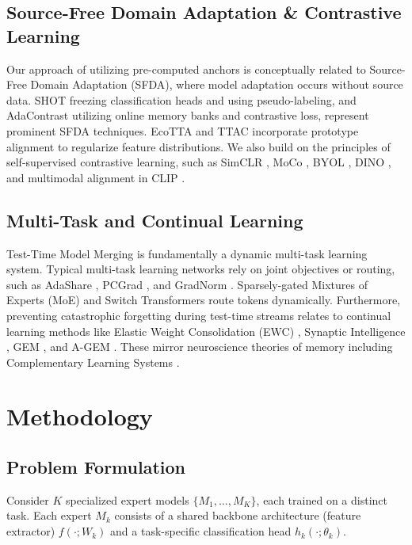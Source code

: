 \documentclass{article}
\theoremstyle{plain}
\theoremstyle{definition}
\theoremstyle{remark}
\begin{document}
\subsection{Source-Free Domain Adaptation \& Contrastive Learning}
Our approach of utilizing pre-computed anchors is conceptually related to Source-Free Domain Adaptation (SFDA), where model adaptation occurs without source data. SHOT \cite{liang2020shot} freezing classification heads and using pseudo-labeling, and AdaContrast \cite{chen2022adacontrast} utilizing online memory banks and contrastive loss, represent prominent SFDA techniques. EcoTTA \cite{yuan2023ecotta} and TTAC \cite{su2023ttac} incorporate prototype alignment to regularize feature distributions. We also build on the principles of self-supervised contrastive learning, such as SimCLR \cite{chen2020simple}, MoCo \cite{he2020momentum}, BYOL \cite{grill2020bootstrap}, DINO \cite{caron2021emerging}, and multimodal alignment in CLIP \cite{radford2021learning}.

\subsection{Multi-Task and Continual Learning}
Test-Time Model Merging is fundamentally a dynamic multi-task learning system. Typical multi-task learning networks rely on joint objectives or routing, such as AdaShare \cite{sun2020adashare}, PCGrad \cite{yu2020gradient}, and GradNorm \cite{chen2018gradnorm}. Sparsely-gated Mixtures of Experts (MoE) \cite{shazeer2017outrageously} and Switch Transformers \cite{fedus2022switch} route tokens dynamically. Furthermore, preventing catastrophic forgetting during test-time streams relates to continual learning methods like Elastic Weight Consolidation (EWC) \cite{kirkpatrick2017overcoming}, Synaptic Intelligence \cite{zenke2017continual}, GEM \cite{lopez2017gradient}, and A-GEM \cite{chaudhry2018efficient}. These mirror neuroscience theories of memory including Complementary Learning Systems \cite{mcclelland1995why, parisi2019continual}.

\section{Methodology}
\label{sec:method}

\subsection{Problem Formulation}
Consider $K$ specialized expert models $\{M_1, \dots, M_K\}$, each trained on a distinct task. Each expert $M_k$ consists of a shared backbone architecture (feature extractor) $f(\cdot; W_k)$ and a task-specific classification head $h_k(\cdot; \theta_k)$.
\end{document}
